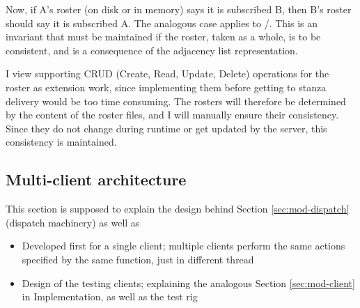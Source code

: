 Now, if A's roster (on disk or in memory) says it is subscribed  B, then B's roster should say it is subscribed  A. The analogous case applies to /. This is an invariant that must be maintained if the roster, taken as a whole, is to be consistent, and is a consequence of the adjacency list representation.

I view supporting CRUD (Create, Read, Update, Delete) operations for the roster as extension work, since implementing them before getting to stanza delivery would be too time consuming. The rosters will therefore be determined by the content of the roster files, and I will manually ensure their consistency. Since they do not change during runtime or get updated by the server, this consistency is maintained.

\subsection{Multi-client architecture}
This section is supposed to explain the design behind Section \ref{sec:mod-dispatch} (dispatch machinery) as well as
\begin{itemize}
  \item Developed first for a single client; multiple clients perform the same actions specified by the same function, just in  different thread
  \item Design of the testing clients; explaining the analogous Section \ref{sec:mod-client} in Implementation, as well as the test rig
\end{itemize}
